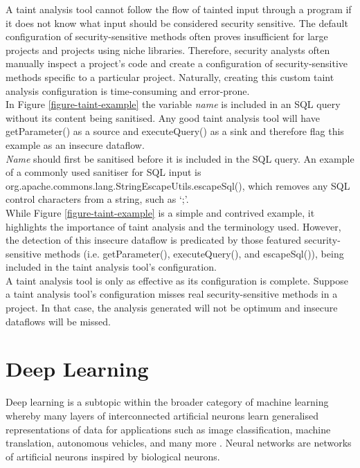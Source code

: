 \noindent
A taint analysis tool cannot follow the flow of tainted input through a program if it does not know what input should be considered security sensitive. The default configuration of security-sensitive methods often proves insufficient for large projects and projects using niche libraries. Therefore, security analysts often manually inspect a project's code and create a configuration of security-sensitive methods specific to a particular project. Naturally, creating this custom taint analysis configuration is time-consuming and error-prone.\\

\noindent
In Figure \ref{figure-taint-example} the variable \emph{name} is included in an SQL query without its content being sanitised. Any good taint analysis tool will have getParameter() as a source and executeQuery() as a sink and therefore flag this example as an insecure dataflow. \\

\noindent
\emph{Name} should first be sanitised before it is included in the SQL query. An example of a commonly used sanitiser for SQL input is\\ org.apache.commons.lang.StringEscapeUtils.escapeSql(), which removes any SQL control characters from a string, such as `;'.\\

\noindent
While Figure \ref{figure-taint-example} is a simple and contrived example, it highlights the importance of taint analysis and the terminology used. However, the detection of this insecure dataflow is predicated by those featured security-sensitive methods (i.e. getParameter(), executeQuery(), and escapeSql()),  being included in the taint analysis tool's configuration.\\

\noindent
A taint analysis tool is only as effective as its configuration is complete. Suppose a taint analysis tool's configuration misses real security-sensitive methods in a project. In that case, the analysis generated will not be optimum and insecure dataflows will be missed. \\

\section{Deep Learning}

Deep learning is a subtopic within the broader category of machine learning whereby many layers of interconnected artificial neurons learn generalised representations of data for applications such as image classification, machine translation, autonomous vehicles, and many more \cite{LecunYann2015Dl}. Neural networks are networks of artificial neurons inspired by biological neurons.\\

